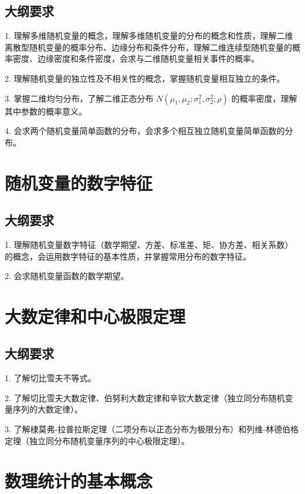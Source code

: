 \subsection{大纲要求}

1. 理解多维随机变量的概念，理解多维随机变量的分布的概念和性质，理解二维离散型随机变量的概率分布、边缘分布和条件分布，理解二维连续型随机变量的概率密度、边缘密度和条件密度，会求与二维随机变量相关事件的概率。

2. 理解随机变量的独立性及不相关性的概念，掌握随机变量相互独立的条件。

3. 掌握二维均匀分布，了解二维正态分布 $N(\mu_1, \mu_2; \sigma_1^2, \sigma_2^2; \rho)$ 的概率密度，理解其中参数的概率意义。

4. 会求两个随机变量简单函数的分布，会求多个相互独立随机变量简单函数的分布。


\section{随机变量的数字特征}

\subsection{大纲要求}

1. 理解随机变量数字特征（数学期望、方差、标准差、矩、协方差、相关系数）的概念，会运用数字特征的基本性质，并掌握常用分布的数字特征。

2. 会求随机变量函数的数学期望。


\section{大数定律和中心极限定理}

\subsection{大纲要求}

1. 了解切比雪夫不等式。

2. 了解切比雪夫大数定律、伯努利大数定律和辛钦大数定律（独立同分布随机变量序列的大数定律）。

3. 了解棣莫弗-拉普拉斯定理（二项分布以正态分布为极限分布）和列维-林德伯格定理（独立同分布随机变量序列的中心极限定理）。


\section{数理统计的基本概念}

